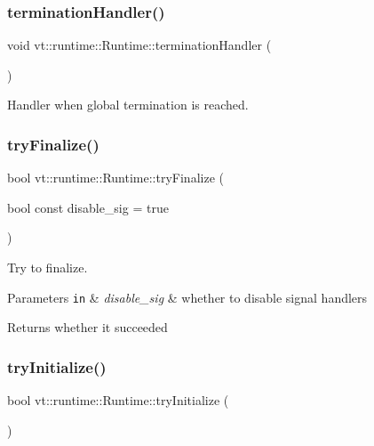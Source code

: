\subsubsection{\texorpdfstring{termination\+Handler()}{terminationHandler()}}
{\footnotesize\ttfamily void vt\+::runtime\+::\+Runtime\+::termination\+Handler (\begin{DoxyParamCaption}{ }\end{DoxyParamCaption})\hspace{0.3cm}{\ttfamily [protected]}}



Handler when global termination is reached. 

\mbox{\label{structvt_1_1runtime_1_1_runtime_a10f74f2fa128ce1f7aa3d69395c64f8c}} 
\subsubsection{\texorpdfstring{try\+Finalize()}{tryFinalize()}}
{\footnotesize\ttfamily bool vt\+::runtime\+::\+Runtime\+::try\+Finalize (\begin{DoxyParamCaption}\item[{bool const}]{disable\+\_\+sig = {\ttfamily true} }\end{DoxyParamCaption})\hspace{0.3cm}{\ttfamily [protected]}}



Try to finalize. 


\begin{DoxyParams}[1]{Parameters}
\mbox{\tt in}  & {\em disable\+\_\+sig} & whether to disable signal handlers\\
\hline
\end{DoxyParams}
\begin{DoxyReturn}{Returns}
whether it succeeded 
\end{DoxyReturn}
\mbox{\label{structvt_1_1runtime_1_1_runtime_a651174e20fa3db2493bd4c0cf2e8be3c}} 
\subsubsection{\texorpdfstring{try\+Initialize()}{tryInitialize()}}
{\footnotesize\ttfamily bool vt\+::runtime\+::\+Runtime\+::try\+Initialize (\begin{DoxyParamCaption}{ }\end{DoxyParamCaption})\hspace{0.3cm}{\ttfamily [protected]}}




